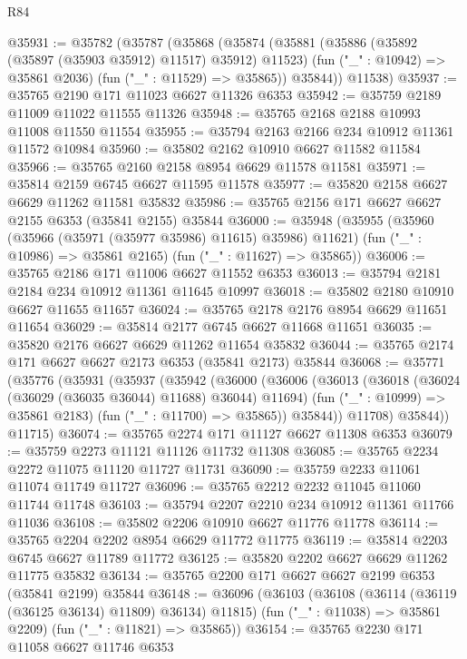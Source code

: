 \begin{lexlean}{R84}
\begin{coremodule}
@35931 := @35782
    (@35787
      (@35868
        (@35874
          (@35881
            (@35886 (@35892 (@35897 (@35903 @35912) @11517) @35912) @11523)
            (fun ("_" : @10942) => @35861 @2036)
            (fun ("_" : @11529) => @35865))
          @35844))
      @11538)
@35937 := @35765 @2190 @171 @11023 @6627 @11326 @6353
@35942 := @35759 @2189 @11009 @11022 @11555 @11326
@35948 := @35765 @2168 @2188 @10993 @11008 @11550 @11554
@35955 := @35794 @2163 @2166 @234 @10912 @11361 @11572 @10984
@35960 := @35802 @2162 @10910 @6627 @11582 @11584
@35966 := @35765 @2160 @2158 @8954 @6629 @11578 @11581
@35971 := @35814 @2159 @6745 @6627 @11595 @11578
@35977 := @35820 @2158 @6627 @6629 @11262 @11581 @35832
@35986 := @35765 @2156 @171 @6627 @6627 @2155 @6353 (@35841 @2155) @35844
@36000 := @35948
    (@35955
      (@35960 (@35966 (@35971 (@35977 @35986) @11615) @35986) @11621)
      (fun ("_" : @10986) => @35861 @2165)
      (fun ("_" : @11627) => @35865))
@36006 := @35765 @2186 @171 @11006 @6627 @11552 @6353
@36013 := @35794 @2181 @2184 @234 @10912 @11361 @11645 @10997
@36018 := @35802 @2180 @10910 @6627 @11655 @11657
@36024 := @35765 @2178 @2176 @8954 @6629 @11651 @11654
@36029 := @35814 @2177 @6745 @6627 @11668 @11651
@36035 := @35820 @2176 @6627 @6629 @11262 @11654 @35832
@36044 := @35765 @2174 @171 @6627 @6627 @2173 @6353 (@35841 @2173) @35844
@36068 := @35771
    (@35776
      (@35931
        (@35937
          (@35942
            (@36000
              (@36006
                (@36013
                  (@36018 (@36024 (@36029 (@36035 @36044) @11688) @36044) @11694)
                  (fun ("_" : @10999) => @35861 @2183)
                  (fun ("_" : @11700) => @35865))
                @35844))
            @11708)
          @35844))
      @11715)
@36074 := @35765 @2274 @171 @11127 @6627 @11308 @6353
@36079 := @35759 @2273 @11121 @11126 @11732 @11308
@36085 := @35765 @2234 @2272 @11075 @11120 @11727 @11731
@36090 := @35759 @2233 @11061 @11074 @11749 @11727
@36096 := @35765 @2212 @2232 @11045 @11060 @11744 @11748
@36103 := @35794 @2207 @2210 @234 @10912 @11361 @11766 @11036
@36108 := @35802 @2206 @10910 @6627 @11776 @11778
@36114 := @35765 @2204 @2202 @8954 @6629 @11772 @11775
@36119 := @35814 @2203 @6745 @6627 @11789 @11772
@36125 := @35820 @2202 @6627 @6629 @11262 @11775 @35832
@36134 := @35765 @2200 @171 @6627 @6627 @2199 @6353 (@35841 @2199) @35844
@36148 := @36096
    (@36103
      (@36108 (@36114 (@36119 (@36125 @36134) @11809) @36134) @11815)
      (fun ("_" : @11038) => @35861 @2209)
      (fun ("_" : @11821) => @35865))
@36154 := @35765 @2230 @171 @11058 @6627 @11746 @6353

\end{coremodule}
\end{lexlean}
